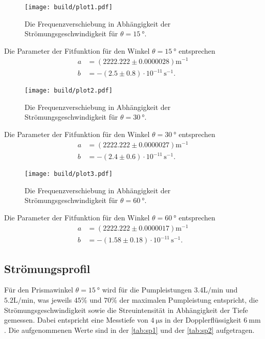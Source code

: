 \begin{figure}[H]
	\texttt{[image: build/plot1.pdf]}
	\captionsetup{width=0.765\linewidth}
	\caption{Die Frequenzverschiebung in Abhängigkeit der Strömungsgeschwindigkeit für $\theta = \qty{15}{°}$.}
	\label{fig:plot1}
\end{figure}
Die Parameter der Fitfunktion für den Winkel $\theta = \qty{15}{°}$ entsprechen
\begin{align*}
  a &= (2222.222 \pm 0.0000028) \mathrm{m}^{-1}\\
  b &= -(2.5\pm 0.8) \cdot 10^{-11}\,\mathrm{s}^{-1}.
\end{align*}
\begin{figure}[H]
	\texttt{[image: build/plot2.pdf]}
	\captionsetup{width=0.765\linewidth}
	\caption{Die Frequenzverschiebung in Abhängigkeit der Strömungsgeschwindigkeit für $\theta = \qty{30}{°}$.}
	\label{fig:plot2}
\end{figure}
Die Parameter der Fitfunktion für den Winkel $\theta = \qty{30}{°}$ entsprechen
\begin{align*}
  a &= (2222.222 \pm 0.0000027) \mathrm{m}^{-1}\\
  b &= -(2.4\pm 0.6) \cdot 10^{-11}\,\mathrm{s}^{-1}.
\end{align*}
\begin{figure}[H]
	\texttt{[image: build/plot3.pdf]}
	\captionsetup{width=0.765\linewidth}
	\caption{Die Frequenzverschiebung in Abhängigkeit der Strömungsgeschwindigkeit für $\theta = \qty{60}{°}$.}
	\label{fig:plot3}
\end{figure}
Die Parameter der Fitfunktion für den Winkel $\theta = \qty{60}{°}$ entsprechen
\begin{align*}
  a &= (2222.222 \pm 0.0000017) \mathrm{m}^{-1}\\
  b &= -(1.58\pm 0.18) \cdot 10^{-11}\,\mathrm{s}^{-1}.
\end{align*}
\subsection{Strömungsprofil}
\label{sec:Strömungsprofil}

Für den Prismawinkel $\theta = \qty{15}{°}$ wird für die Pumpleistungen $ 3.4 \si{\liter\per\minute}$ und $ 5.2 \si{\liter\per\minute}$, was jeweils
$45\%$  und $70\%$ der maximalen Pumpleistung entspricht, die Strömungsgeschwindigkeit sowie die Streuintensität in Abhängigkeit der Tiefe gemessen.
Dabei entspricht eine Messtiefe von $\qty{4}{\micro\second}$ in der Dopplerflüssigkeit $\qty{6}{\milli\meter}$.
Die aufgenommenen Werte sind in der \autoref{tab:sp1} und der \autoref{tab:sp2} aufgetragen.

